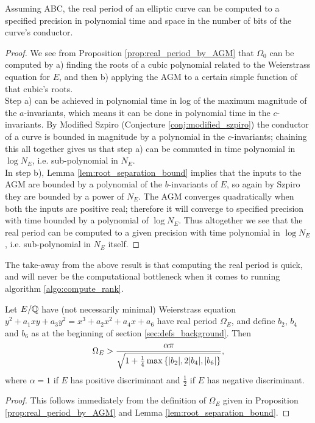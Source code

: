 \documentclass[10pt]{article}
\begin{document}
\begin{corollary}
Assuming ABC, the real period of an elliptic curve can be computed to a specified precision in polynomial time and space in the number of bits of the curve's conductor.
\end{corollary}
\begin{proof}
We see from Proposition \ref{prop:real_period_by_AGM} that $\Omega_0$ can be computed by a) finding the roots of a cubic polynomial related to the Weierstrass equation for $E$, and then b) applying the AGM to a certain simple function of that cubic's roots. \\

Step a) can be achieved in polynomial time in log of the maximum magnitude of the $a$-invariants, which means it can be done in polynomial time in the $c$-invariants. By Modified Szpiro (Conjecture \ref{conj:modified_szpiro}) the conductor of a curve is bounded in magnitude by a polynomial in the $c$-invariants; chaining this all together gives us that step a) can be commuted in time polynomial in $\log N_E$, i.e. sub-polynomial in $N_E$. \\

In step b), Lemma \ref{lem:root_separation_bound} implies that the inputs to the AGM are bounded by a polynomial of the $b$-invariants of $E$, so again by Szpiro they are bounded by a power of $N_E$. The AGM converges quadratically when both the inputs are positive real; therefore it will converge to specified precision with time bounded by a polynomial of $\log N_E$. Thus altogether we see that the real period can be computed to a given precision with time polynomial in $\log N_E$, i.e. sub-polynomial in $N_E$ itself.
\end{proof}

The take-away from the above result is that computing the real period is quick, and will never be the computational bottleneck when it comes to running algorithm \ref{algo:compute_rank}. \\

\begin{corollary}[S.]\label{ineq:Omega_bn_bound}
Let $E/\mathbb{Q}$ have (not necessarily minimal) Weierstrass equation \\
$y^2 + a_1 xy + a_3 y^2 = x^3 + a_2 x^2 + a_4 x + a_6$ have real period $\Omega_E$, and define $b_2$, $b_4$ and $b_6$ as at the beginning of section \ref{sec:defs_background}. Then
\begin{equation}
\Omega_E > \frac{\alpha \pi}{\sqrt{1+\frac{1}{4}\max\left\{|b_2|,2|b_4|,|b_6|\right\}}},
\end{equation}
where $\alpha = 1$ if $E$ has positive discriminant and $\frac{1}{2}$ if $E$ has negative discriminant.
\end{corollary}
\begin{proof}
This follows immediately from the definition of $\Omega_E$ given in Proposition \ref{prop:real_period_by_AGM} and Lemma \ref{lem:root_separation_bound}.
\end{proof}
\end{document}
